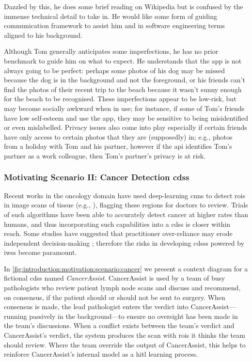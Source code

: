 Dazzled by this, he does some brief reading on Wikipedia but is confused by the immense technical detail to take in. He would like some form of guiding communication framework to assist him and in software engineering terms aligned to his background.

Although Tom generally anticipates some imperfections, he has no prior benchmark to guide him on what to expect. He understands that the app is not always going to be perfect: perhaps some photos of his dog may be missed because the dog is in the background and not the foreground, or his friends can't find the photos of their recent trip to the beach because it wasn't sunny enough for the beach to be recognised. These imperfections appear to be low-risk, but may become socially awkward when in use; for instance, if some of Tom's friends have low self-esteem and use the app, they may be sensitive to being misidentified or even mislabelled. Privacy issues also come into play especially if certain friends have only access to certain photos that they are (supposedly) in; e.g., photos from a holiday with Tom and his partner, however if the \gls{api} identifies Tom's partner as a work colleague, then Tom's partner's privacy is at risk.


\subsubsection{Motivating Scenario II: Cancer Detection \gls{cdss}}
\label{ssec:introduction:motivation:scenario:cancer}

Recent works in the oncology domain have used deep-learning \glspl{cnn} to detect \glspl{roi} in image scans of tissue (e.g., \citep{Liu:2018fa,Haenssle:2018bz,EhteshamiBejnordi:2017kq}), flagging these regions for doctors to review. Trials of such algorithms have been able to accurately detect cancer at higher rates than humans, and thus incorporating such capabilities into a \gls{cdss} is closer within reach. Some studies have suggested that practitioner over-reliance may erode independent decision-making \citep{Jaspers:2011hy,Chambers:1991uh}; therefore the risks in developing \glspl{cdss} powered by \glspl{iws} become paramount.

In \cref{fig:introduction:motivation:scenario:cancer} we present a context diagram for a fictional \gls{cdss} named \textit{CancerAssist}. CancerAssist is used by a team of busy pathologists who review patient lymph node scans and discuss and recommend, on consensus, if the patient should or should not be sent to surgery. When consensus is made, the lead pathologist enters the verdict into CancerAssist---running passively in the background---to ensure no oversight has been made in the team's discussions. When a conflict exists between the team's verdict and CancerAssist's verdict, the system produces the scan with \glspl{roi} it thinks the team should review. Where the team override the output of CancerAssist, this helps to reinforce CancerAssist's internal model as a \gls{hitl} learning process.


